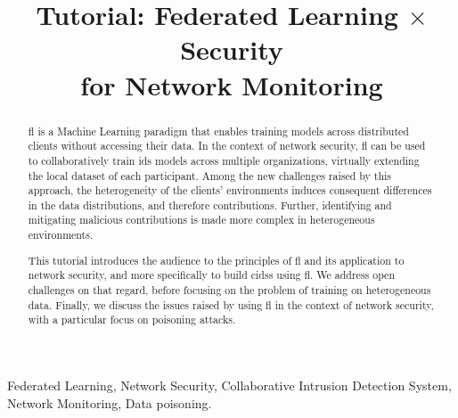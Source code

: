 \documentclass[conference]{IEEEtran}
\begin{document}
\title{Tutorial: Federated Learning $\times$ Security \\for Network Monitoring}
\author{
\and
{}
}

\maketitle

\begin{abstract}
    \Gls{fl} is a Machine Learning paradigm that enables training models across distributed clients without accessing their data.
    In the context of network security, \gls{fl} can be used to collaboratively train \gls{ids} models across multiple organizations, virtually extending the local dataset of each participant.
    Among the new challenges raised by this approach, the heterogeneity of the clients' environments induces consequent differences in the data distributions, and therefore contributions.
    Further, identifying and mitigating malicious contributions is made more complex in heterogeneous environments.

    This tutorial introduces the audience to the principles of \gls{fl} and its application to network security, and more specifically to build \glspl{cids} using \gls{fl}.
    We address open challenges on that regard, before focusing on the problem of training on heterogeneous data.
    Finally, we discuss the issues raised by using \gls{fl} in the context of network security, with a particular focus on poisoning attacks.
\end{abstract}

\glsresetall

\begin{IEEEkeywords}
Federated Learning, Network Security, Collaborative Intrusion Detection System, Network Monitoring, Data poisoning.
\end{IEEEkeywords}
\end{document}
